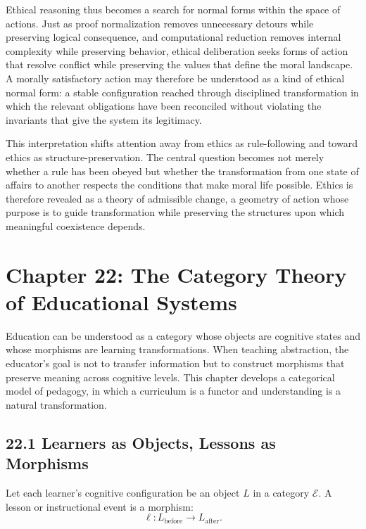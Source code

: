 \documentclass[12pt,letterpaper]{article}
\theoremstyle{remark}
\begin{document}
Ethical reasoning thus becomes a search for normal forms within the space of actions. Just as proof normalization removes unnecessary detours while preserving logical consequence, and computational reduction removes internal complexity while preserving behavior, ethical deliberation seeks forms of action that resolve conflict while preserving the values that define the moral landscape. A morally satisfactory action may therefore be understood as a kind of ethical normal form: a stable configuration reached through disciplined transformation in which the relevant obligations have been reconciled without violating the invariants that give the system its legitimacy.

This interpretation shifts attention away from ethics as rule-following and toward ethics as structure-preservation. The central question becomes not merely whether a rule has been obeyed but whether the transformation from one state of affairs to another respects the conditions that make moral life possible. Ethics is therefore revealed as a theory of admissible change, a geometry of action whose purpose is to guide transformation while preserving the structures upon which meaningful coexistence depends.

\newpage

\section{Chapter 22: The Category Theory of Educational Systems}

Education can be understood as a category whose objects are cognitive states and whose morphisms are learning transformations. When teaching abstraction, the educator’s goal is not to transfer information but to construct morphisms that preserve meaning across cognitive levels. This chapter develops a categorical model of pedagogy, in which a curriculum is a functor and understanding is a natural transformation.

\subsection{22.1 Learners as Objects, Lessons as Morphisms}

Let each learner’s cognitive configuration be an object \(L\) in a category \(\mathcal{E}\). A lesson or instructional event is a morphism:
\[
\ell : L_{\text{before}} \to L_{\text{after}}.
\]
\end{document}
